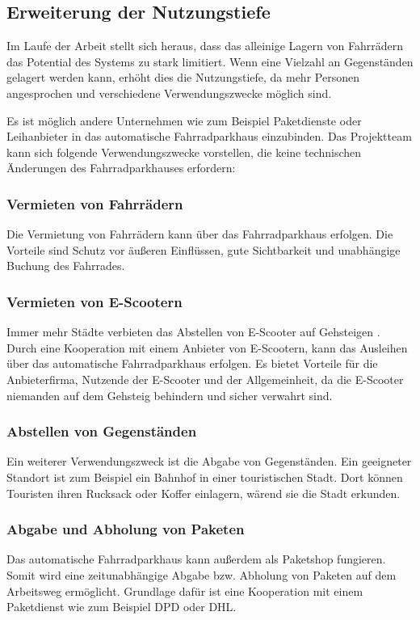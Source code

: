 \break
\subsection{Erweiterung der Nutzungstiefe}

Im Laufe der Arbeit stellt sich heraus, dass das alleinige Lagern von Fahrrädern das Potential des Systems zu stark limitiert. Wenn eine Vielzahl an Gegenständen gelagert werden kann, erhöht dies die Nutzungstiefe, da mehr Personen angesprochen und verschiedene Verwendungszwecke möglich sind.

\noindent Es ist möglich andere Unternehmen wie zum Beispiel Paketdienste oder Leihanbieter in das automatische Fahrradparkhaus einzubinden.
\noindent Das Projektteam kann sich folgende Verwendungszwecke vorstellen, die keine technischen Änderungen des Fahrradparkhauses erfordern:

\subsubsection{Vermieten von Fahrrädern}
Die Vermietung von Fahrrädern kann über das Fahrradparkhaus erfolgen. Die Vorteile sind Schutz vor äußeren Einflüssen, gute Sichtbarkeit und unabhängige Buchung des Fahrrades.

\subsubsection{Vermieten von E-Scootern}
Immer mehr Städte verbieten das Abstellen von E-Scooter auf Gehsteigen . Durch eine Kooperation mit einem Anbieter von E-Scootern, kann das Ausleihen über das automatische Fahrradparkhaus erfolgen. Es bietet Vorteile für die Anbieterfirma, Nutzende der E-Scooter und der Allgemeinheit, da die E-Scooter niemanden auf dem Gehsteig behindern und sicher verwahrt sind.

\subsubsection{Abstellen von Gegenständen}
Ein weiterer Verwendungszweck ist die Abgabe von Gegenständen. Ein geeigneter Standort ist zum Beispiel ein Bahnhof in einer touristischen Stadt. Dort können Touristen ihren Rucksack oder Koffer einlagern, wärend sie die Stadt erkunden.

\subsubsection{Abgabe und Abholung von Paketen}
Das automatische Fahrradparkhaus kann außerdem als Paketshop fungieren. Somit wird eine zeitunabhängige Abgabe bzw. Abholung von Paketen auf dem Arbeitsweg ermöglicht. Grundlage dafür ist eine Kooperation mit einem Paketdienst wie zum Beispiel DPD oder DHL.

